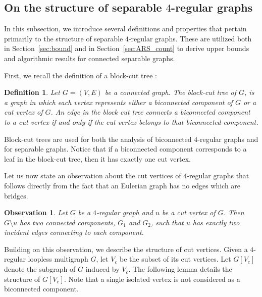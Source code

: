 \documentclass{article}
\newtheorem{definition}{Definition}
\newtheorem{observation}{Observation}
\begin{document}
    \subsection{On the structure of separable \texorpdfstring{$4$}{4}-regular graphs}\label{sec:stru_s}


        In this subsection, we introduce several definitions and properties that pertain primarily to the structure of separable $4$-regular graphs.
        These are utilized both in Section~\ref{sec:bound} and in Section~\ref{sec:ARS_count} to derive upper bounds and algorithmic results for connected separable graphs.
    
        First, we recall the definition of a block-cut tree \cite{Harary69}:
    
        \begin{definition}
            Let $G=(V,E)$ be a connected graph.  
            The \emph{block-cut tree} of $G$, is a graph in which each vertex represents either a biconnected component of $G$ or a cut vertex of $G$.  
            An edge in the block cut tree connects a biconnected component to a cut vertex if and only if the cut vertex belongs to that biconnected component.
        \end{definition}
        
        Block-cut trees are used for both the analysis of biconnected $4$-regular graphs and for separable graphs.
        Notice that if a biconnected component corresponds to a leaf in the block-cut tree, then it has exactly one cut vertex.
    
        Let us now state an observation about the cut vertices of $4$-regular graphs that follows directly from the fact that an Eulerian graph has no edges which are bridges.
    
        \begin{observation}\label{obs:hand}
            Let $G$ be a $4$-regular graph and $u$ be a cut vertex of $G$. 
            Then $G\setminus u$ has two connected components, $G_1$ and $G_2$, such that $u$ has exactly two incident edges connecting to each component.
        \end{observation}

        Building on this observation, we describe the structure of cut vertices.
        Given a $4$-regular loopless multigraph $G$, let $V_c$ be the subset of its cut vertices.
        Let $G[V_c]$ denote the subgraph of $G$ induced by $V_c$.
        The following lemma details the structure of $G[V_c]$.
        Note that a single isolated vertex is not considered as a biconnected component.
\end{document}
